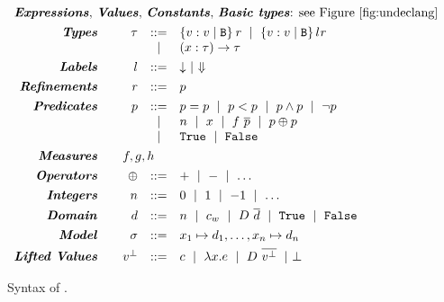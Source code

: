 
\renewcommand\restrictdecidable[2]{#1}
\newcommand\samerule[1]{}


\begin{figure}[t!]
\centering
\captionsetup{justification=centering}
$$
\begin{array}{rrcl}
\multicolumn{4}{l}{\text{\emphbf{Expressions}, \emphbf{Values}, \emphbf{Constants}, \emphbf{Basic types}:
see Figure~\ref{fig:undeclang}}} \\[0.05in]

\emphbf{Types} \quad 
  & \tau
  & ::=  
  & 	 \tref{v}{\ttbase}{}{\refi}
  \spmid \tref{v}{\ttbase}{l}{\refi}\\
  &&
  \spmid & \tfunref{x}{\tau}{\tau}{v}{\refi}   \\[0.05in]

\emphbf{Labels} \quad 
  & l
  & ::= 
  & \trivial \spmid \finite 
  \\[0.05in] 

\emphbf{Refinements} \quad 
  & \refi
  & ::=
  & p
  \\[0.05in] 

\emphbf{Predicates} \quad 
  & p
  & ::= 
  &   	 \lterm = \lterm
  \spmid \lterm < \lterm
  \spmid       p \land p
  \spmid \lnot p\\
  &&
  \spmid &   	 n 
  \spmid x 
  \spmid f \ \overline{\lterm}
  \spmid \lterm \oplus \lterm
  \\ && \spmid &
  \etrue
  \spmid \efalse 
  \\[0.05in] 

\emphbf{Measures} \quad 
  & \multicolumn{3}{l}{f,g,h}
  \\[0.05in] 
  
\emphbf{Operators} \quad 
  & \oplus
  & ::= 
  &   	 + 
  \spmid -  
  \spmid \dots
  \\[0.05in] 
  
\emphbf{Integers} \quad 
  & n
  & ::= 
  &   	 0 
  \spmid 1
  \spmid -1
  \spmid \dots
  \\[0.05in] 

\emphbf{Domain} \quad 
  & d
  & ::= 
  & n 
  \spmid c_w 
  \spmid D\ \overline{d}  
  \spmid \etrue
  \spmid \efalse
  \\[0.05in] 
  
\emphbf{Model} \quad 
  & \sigma & ::= & \gbind{x_1}{d_1},\ldots,\gbind{x_n}{d_n}
  \\[0.05in] 

\emphbf{Lifted Values} \quad 
  & \botv
  & ::= 
  &   	 c 
  \spmid \efun{x}{}{e} 
  \spmid D \ \overline{\botv}
  \spmid \ebot
\end{array}
$$
\caption{Syntax of \declang.}
\label{fig:declang:syntax}
\end{figure}


